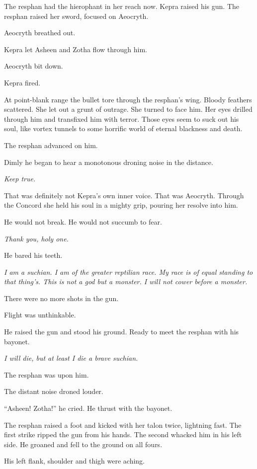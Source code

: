 \documentclass
  [a4paper,
   12pt,
   oneside
  ]%
  {article}
\begin{document}
The resphan had the hierophant in her reach now.
Kepra raised his gun. 
The resphan raised her sword, focused on Aeocryth. 

Aeocryth breathed out. 

Kepra let Asheen and Zotha flow through him. 

Aeocryth bit down.

Kepra fired. 

At point-blank range the bullet tore through the resphan’s wing. 
Bloody feathers scattered. 
She let out a grunt of outrage. 
She turned to face him. 
Her eyes drilled through him and transfixed him with terror. 
Those eyes seem to suck out his soul, like vortex tunnels to some horrific world of eternal blackness and death. 

The resphan advanced on him. 

Dimly he began to hear a monotonous droning noise in the distance.

\emph{Keep true.} 

That was definitely not Kepra's own inner voice. 
That was Aeocryth. 
Through the Concord she held his soul in a mighty grip, pouring her resolve into him.

He would not break.
He would not succumb to fear.

\emph{Thank you, holy one.}

He bared his teeth.

\emph{%
    I am a suchian. I am of the greater reptilian race. My race is of equal standing to that thing's. This is not a god but a monster. I will not cower before a monster.}

There were no more shots in the gun. 

Flight was unthinkable.

He raised the gun and stood his ground. Ready to meet the resphan with his bayonet. 

\emph{I will die, but at least I die a brave suchian.} 

The resphan was upon him.

The distant noise droned louder.

``Asheen! Zotha!'' he cried. He thrust with the bayonet.

The resphan raised a foot and kicked with her talon twice, lightning fast. 
The first strike ripped the gun from his hands. 
The second whacked him in his left side. He groaned and fell to the ground on all fours. 

His left flank, shoulder and thigh were aching. 
\end{document}
